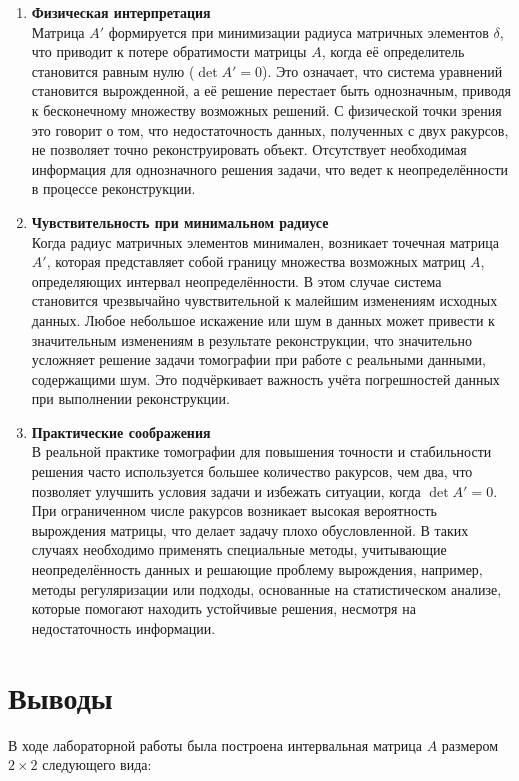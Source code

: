 \documentclass[a4paper,14pt]{article}
\begin{document}
	\begin{enumerate}
		\item \textbf{Физическая интерпретация} \\
			Матрица \( A' \) формируется при минимизации радиуса матричных элементов \( \delta \),
			 что приводит к потере обратимости матрицы \( A \), когда её определитель становится равным нулю
			  (\( \det A' = 0 \)). Это означает, что система уравнений становится вырожденной, а её решение 
			  перестает быть однозначным, приводя к бесконечному множеству возможных решений. 
			  С физической точки зрения это говорит о том, что недостаточность данных, полученных с двух ракурсов, 
			  не позволяет точно реконструировать объект. Отсутствует необходимая информация для однозначного решения 
			  задачи, что ведет к неопределённости в процессе реконструкции.
		
		\item \textbf{Чувствительность при минимальном радиусе} \\
			Когда радиус матричных элементов минимален, возникает точечная матрица \( A' \), которая представляет 
			собой границу множества возможных матриц \( A \), определяющих интервал неопределённости. В этом 
			случае система становится чрезвычайно чувствительной к малейшим изменениям исходных данных. Любое 
			небольшое искажение или шум в данных может привести к значительным изменениям в результате реконструкции, 
			что значительно усложняет решение задачи томографии при работе с реальными данными, содержащими шум. 
			Это подчёркивает важность учёта погрешностей данных при выполнении реконструкции.
	
		\item \textbf{Практические соображения} \\
			В реальной практике томографии для повышения точности и стабильности решения часто используется 
			большее количество ракурсов, чем два, что позволяет улучшить условия задачи и избежать ситуации, 
			когда \( \det A' = 0 \). При ограниченном числе ракурсов возникает высокая вероятность вырождения матрицы, 
			что делает задачу плохо обусловленной. В таких случаях необходимо применять специальные методы, учитывающие 
			неопределённость данных и решающие проблему вырождения, например, методы регуляризации или подходы, 
			основанные на статистическом анализе, которые помогают находить устойчивые решения, несмотря на недостаточность информации.
	\end{enumerate}

	\section{Выводы}
	В ходе лабораторной работы была построена интервальная матрица \(A\)
	размером \(2 \times 2\) следующего вида:
\end{document}
